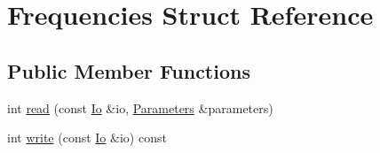 \hypertarget{structFrequencies}{}\section{Frequencies Struct Reference}
\label{structFrequencies}
\subsection*{Public Member Functions}
\begin{DoxyCompactItemize}
\item 
int \mbox{\hyperlink{structFrequencies_a0ca8d3fc3618359ac9630fbc0a99360f}{read}} (const \mbox{\hyperlink{structIo}{Io}} \&io, \mbox{\hyperlink{classParameters}{Parameters}} \&parameters)
\item 
int \mbox{\hyperlink{structFrequencies_a63d7282f4200d541b96279591312f22f}{write}} (const \mbox{\hyperlink{structIo}{Io}} \&io) const
\end{DoxyCompactItemize}
